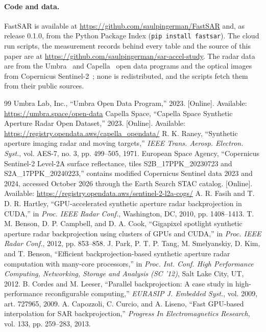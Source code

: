 \documentclass[11pt]{article}
\begin{document}
\paragraph{Code and data.} FastSAR is available at \url{https://github.com/saulpingerman/FastSAR} and, as release 0.1.0, from the Python Package Index (\texttt{pip install fastsar}). The cloud run scripts, the measurement records behind every table and the source of this paper are at \url{https://github.com/saulpingerman/sar-accel-study}. The radar data are from the Umbra~\cite{umbra2023} and Capella~\cite{capella2023} open data programs and the optical images from Copernicus Sentinel-2~\cite{sentinel2}; none is redistributed, and the scripts fetch them from their public sources.

\begin{thebibliography}{99}
 Umbra Lab, Inc., ``Umbra Open Data Program,'' 2023. [Online]. Available: \url{https://umbra.space/open-data}
 Capella Space, ``Capella Space Synthetic Aperture Radar Open Dataset,'' 2023. [Online]. Available: \url{https://registry.opendata.aws/capella_opendata/}
 R. K. Raney, ``Synthetic aperture imaging radar and moving targets,'' \emph{IEEE Trans. Aerosp. Electron. Syst.}, vol. AES-7, no. 3, pp. 499--505, 1971.
 European Space Agency, ``Copernicus Sentinel-2 Level-2A surface reflectance, tiles S2B\_17PPK\_20230723 and S2A\_17PPK\_20240223,'' contains modified Copernicus Sentinel data 2023 and 2024, accessed October 2026 through the Earth Search STAC catalog. [Online]. Available: \url{https://registry.opendata.aws/sentinel-2-l2a-cogs/}
 A. R. Fasih and T. D. R. Hartley, ``GPU-accelerated synthetic aperture radar backprojection in CUDA,'' in \emph{Proc. IEEE Radar Conf.}, Washington, DC, 2010, pp. 1408--1413.
 T. M. Benson, D. P. Campbell, and D. A. Cook, ``Gigapixel spotlight synthetic aperture radar backprojection using clusters of GPUs and CUDA,'' in \emph{Proc. IEEE Radar Conf.}, 2012, pp. 853--858.
 J. Park, P. T. P. Tang, M. Smelyanskiy, D. Kim, and T. Benson, ``Efficient backprojection-based synthetic aperture radar computation with many-core processors,'' in \emph{Proc. Int. Conf. High Performance Computing, Networking, Storage and Analysis (SC '12)}, Salt Lake City, UT, 2012.
 B. Cordes and M. Leeser, ``Parallel backprojection: A case study in high-performance reconfigurable computing,'' \emph{EURASIP J. Embedded Syst.}, vol. 2009, art. 727965, 2009.
 A. Capozzoli, C. Curcio, and A. Liseno, ``Fast GPU-based interpolation for SAR backprojection,'' \emph{Progress In Electromagnetics Research}, vol. 133, pp. 259--283, 2013.

\end{thebibliography}
\end{document}
